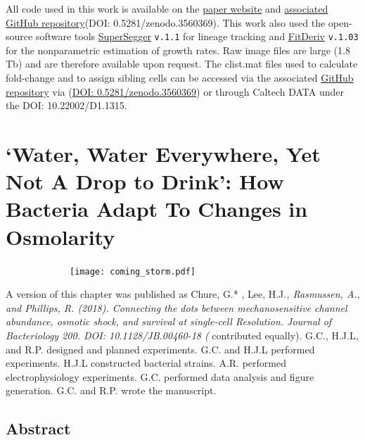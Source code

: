 \documentclass[12pt]{caltech_thesis}
\begin{document}
All code used in this work is available on the
\href{https://github.com/rpgroup-pboc/mwc_growth}{paper website} and
\href{https://www.github.com/rpgroup-pboc/mwc_growth}{associated GitHub
repository}(DOI: 0.5281/zenodo.3560369). This work also used the
open-source software tools
\href{http://mtshasta.phys.washington.edu/website/SuperSegger.php}{SuperSegger}
\texttt{v.1.1}\autocite{stylianidou2016,cass2017} for lineage tracking
and \href{http://swainlab.bio.ed.ac.uk/software/fitderiv/}{FitDeriv}
\texttt{v.1.03} \autocite{swain2016} for the nonparametric estimation of
growth rates. Raw image files are large (1.8 Tb) and are therefore
available upon request. The clist.mat files used to calculate
fold-change and to assign sibling cells can be accessed via the
associated \href{https://github.com/rpgroup-pboc/mwc_growth}{GitHub
repository} via (\href{http://doi.org/10.5281/zenodo.3560369}{DOI:
0.5281/zenodo.3560369}) or through Caltech DATA under the DOI:
10.22002/D1.1315.

\hypertarget{water-water-everywhere-yet-not-a-drop-to-drink-how-bacteria-adapt-to-changes-in-osmolarity}{%
\chapter{`Water, Water Everywhere, Yet Not A Drop to Drink': How
Bacteria Adapt To Changes in
Osmolarity}\label{water-water-everywhere-yet-not-a-drop-to-drink-how-bacteria-adapt-to-changes-in-osmolarity}}

~~~~~~~~~~~~~\texttt{[image: coming\_storm.pdf]}

A version of this chapter was published as Chure, G.* , Lee, H.J.\emph{,
Rasmussen, A., and Phillips, R. (2018). Connecting the dots between
mechanosensitive channel abundance, osmotic shock, and survival at
single-cell Resolution. Journal of Bacteriology 200. DOI:
10.1128/JB.00460-18 (} contributed equally). G.C., H.J.L, and R.P.
designed and planned experiments. G.C. and H.J.L performed experiments.
H.J.L constructed bacterial strains. A.R. performed electrophysiology
experiments. G.C. performed data analysis and figure generation. G.C.
and R.P. wrote the manuscript.

\hypertarget{abstract-3}{%
\section{Abstract}\label{abstract-3}}
\end{document}
